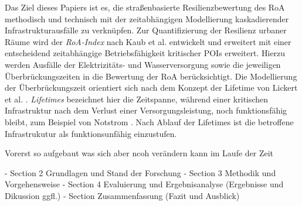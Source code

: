


Das Ziel dieses Papiers ist es, die straßenbasierte Resilienzbewertung des RoA methodisch und technisch mit der zeitabhängigen Modellierung kaskadierender Infrastrukturausfälle zu verknüpfen. Zur Quantifizierung der Resilienz urbaner Räume wird der \textit{RoA-Index} nach Kaub et al. \cite{kaub2024} entwickelt und erweitert mit einer entscheidend zeitabhängige Betriebsfähigkeit kritischer POIs erweitert. Hierzu werden Ausfälle der Elektrizitäts- und Wasserversorgung sowie die jeweiligen Überbrückungszeiten in die Bewertung der RoA berücksichtigt. Die Modellierung der Überbrückungszeit orientiert sich nach dem Konzept der Lifetime von Lickert et al. \cite{lickert2024}. \textit{Lifetimes} bezeichnet hier die Zeitspanne, während einer kritischen Infrastruktur nach dem Verlust einer Versorgungsleistung, noch funktionsfähig bleibt, zum Beispiel von Notstrom \cite{lickert2024}. Nach Ablauf der Lifetimes ist die betroffene Infrastrukutur als funktionsunfähig einzustufen.




Vorerst so aufgebaut was sich aber ncoh verändern kann im Laufe der Zeit

- Section 2 Grundlagen und Stand der Forschung
- Section 3 Methodik und Vorgehensweise
- Section 4 Evaluierung und Ergebnisanalyse (Ergebnisse und Dikussion ggfl.)
- Section Zusammenfassung (Fazit und Ausblick)



